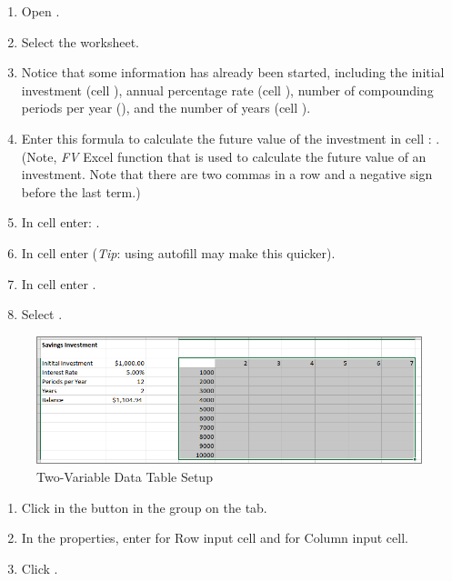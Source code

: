 \begin{enumerate}
	\item Open .
	\item Select the  worksheet.
	\item Notice that some information has already been started, including the initial investment (cell ), annual percentage rate (cell ), number of compounding periods per year (), and the number of years (cell ).
	\item Enter this formula to calculate the future value of the investment in cell : . (Note, \textit{FV} Excel function that is used to calculate the future value of an investment. Note that there are two commas in a row and a negative sign before the last term.)
	\item In cell  enter: .
	\item In cell  enter  (\textit{Tip}: using autofill may make this quicker).
	\item In cell  enter .
	\item Select .
\end{enumerate}

\begin{figure}[H]
	\centering
	\includegraphics[width=\maxwidth{.95\linewidth}]{gfx/ch07_fig49}
	\caption{Two-Variable Data Table Setup}
	\label{07:fig49}
\end{figure}

\begin{enumerate}[resume]	
	\item Click  in the  button in the  group on the  tab.
	\item In the  properties, enter  for Row input cell and  for Column input cell.
	\item Click .
\end{enumerate}

